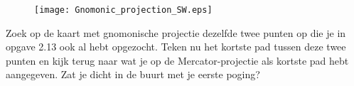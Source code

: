 \begin{figure}[h]
	\centering
	\texttt{[image: Gnomonic\_projection\_SW.eps]}
\end{figure}

\begin{opgave}
	Zoek op de kaart met gnomonische projectie dezelfde twee punten op die je in opgave 2.13 ook al hebt opgezocht. Teken nu het kortste pad tussen deze twee punten en kijk terug naar wat je op de Mercator-projectie als kortste pad hebt aangegeven. Zat je dicht in de buurt met je eerste poging?
\end{opgave}

\newpage